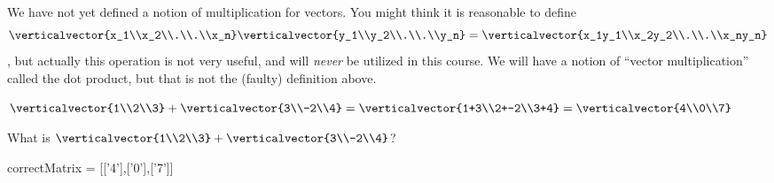  	\begin{warning}
 	  We have not yet defined a notion of multiplication for vectors.  You might think it is reasonable to define 
 	  \[\verticalvector{x_1\\x_2\\.\\.\\x_n} \verticalvector{y_1\\y_2\\.\\.\\y_n}=\verticalvector{x_1y_1\\x_2y_2\\.\\.\\x_ny_n}\], but 
 	  actually this operation is not very useful, and will \textit{never} be utilized in this course.  We will have a notion of ``vector multiplication'' called the dot 
 	  product, but that is not the (faulty) definition above.
 	\end{warning}
 	
 	\begin{question}
 		\begin{solution}
 		\begin{hint}
 			$\verticalvector{1\\2\\3}+\verticalvector{3\\-2\\4} = \verticalvector{1+3\\2+-2\\3+4} = \verticalvector{4\\0\\7}$
 		\end{hint}
 		What is $\verticalvector{1\\2\\3}+\verticalvector{3\\-2\\4}$?
 		
 		\begin{matrix-answer}[name=v]
 			correctMatrix = [['4'],['0'],['7']]
 		\end{matrix-answer}
 		\end{solution}
 	\end{question}
 	
